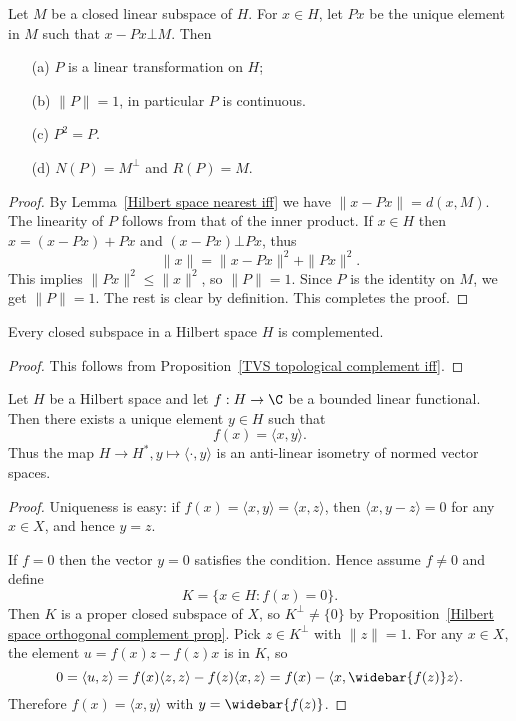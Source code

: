\begin{proposition}\label{Hilbert orthogonal projection prop}
Let $M$ be a closed linear subspace of $H$. For $x\in H$, let $Px$ be the unique element in $M$ such that $x-Px\bot M$. Then
\begin{itemize}
\item[(a)] $P$ is a linear transformation on $H$;
\item[(b)] $\|P\|=1$, in particular $P$ is continuous.
\item[(c)] $P^2=P$.
\item[(d)] $N(P)=M^\bot$ and $R(P)=M$.
\end{itemize}
\end{proposition}
\begin{proof}
By Lemma~\ref{Hilbert space nearest iff} we have $\|x-Px\|=d(x,M)$. The linearity of $P$ follows from that of the inner product. If $x\in H$ then $x=(x-Px)+Px$ and $(x-Px)\bot Px$, thus
\[\|x\|=\|x-Px\|^2+\|Px\|^2.\]
This implies $\|Px\|^2\leq\|x\|^2$, so $\|P\|=1$. Since $P$ is the identity on $M$, we get $\|P\|=1$. The rest is clear by definition. This completes the proof.
\end{proof}
\begin{corollary}
Every closed subspace in a Hilbert space $H$ is complemented.
\end{corollary}
\begin{proof}
This follows from Proposition~\ref{TVS topological complement iff}.
\end{proof}
\begin{theorem}\label{Hilber space Riesz}
Let $H$ be a Hilbert space and let $f:H\to\C$ be a bounded linear functional. Then there exists a unique element $y\in H$ such that
\[f(x)=\langle x,y\rangle.\]
Thus the map $H\to H^*,y\mapsto\langle\cdot,y\rangle$ is an anti-linear isometry of normed vector spaces.
\end{theorem}
\begin{proof}
Uniqueness is easy: if $f(x)=\langle x,y\rangle=\langle x,z\rangle$, then $\langle x,y-z\rangle=0$ for any $x\in X$, and hence $y=z$.\par
If $f=0$ then the vector $y=0$ satisfies the condition. Hence assume $f\neq 0$ and define
\[K=\{x\in H:f(x)=0\}.\]
Then $K$ is a proper closed subspace of $X$, so $K^\bot\neq\{0\}$ by Proposition~\ref{Hilbert space orthogonal complement prop}. Pick $z\in K^{\bot}$ with $\|z\|=1$. For any $x\in X$, the element $u=f(x)z-f(z)x$ is in $K$, so
\[0=\langle u,z\rangle=f(x)\langle z,z\rangle-f(z)\langle x,z\rangle=f(x)-\langle x,\widebar{f(z)}z\rangle.\]
Therefore $f(x)=\langle x,y\rangle$ with $y=\widebar{f(z)}$.
\end{proof}
